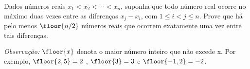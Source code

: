 Dados números reais $x_1 < x_2 < \cdots < x_n$, suponha que todo número real ocorre no máximo duas vezes entre as diferenças $x_j - x_i$, com $1 \le i < j \le n$.
Prove que há pelo menos $\floor{n/2}$ números reais que ocorrem exatamente uma vez entre tais diferenças.

\textit{Observação:} $\floor{x}$ denota o maior número inteiro que não excede x. Por exemplo, $\floor{2,5} = 2$ , $\floor{3} = 3$ e $\floor{-1,2} = -2$.
